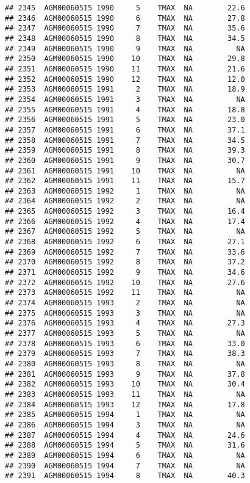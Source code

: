 \documentclass{article}\usepackage[]{graphicx}\usepackage[]{color}
\makeatletter
\newenvironment{kframe}{%
 \def\at@end@of@kframe{}%
 \ifinner\ifhmode%
  \def\at@end@of@kframe{\end{minipage}}%
  \begin{minipage}{\columnwidth}%
 \fi\fi%
 \def\FrameCommand##1{\hskip\@totalleftmargin \hskip-\fboxsep
 \colorbox{shadecolor}{##1}\hskip-\fboxsep
     \hskip-\linewidth \hskip-\@totalleftmargin \hskip\columnwidth}%
 \MakeFramed {\advance\hsize-\width
   \@totalleftmargin\z@ \linewidth\hsize
   \@setminipage}}%
 {\par\unskip\endMakeFramed%
 \at@end@of@kframe}
\newenvironment{knitrout}{}{} %
\makeatother
\begin{document}
\begin{knitrout}
\begin{kframe}
\begin{verbatim}
## 2345  AGM00060515 1990     5    TMAX  NA        22.6
## 2346  AGM00060515 1990     6    TMAX  NA        27.8
## 2347  AGM00060515 1990     7    TMAX  NA        35.6
## 2348  AGM00060515 1990     8    TMAX  NA        34.5
## 2349  AGM00060515 1990     9    TMAX  NA          NA
## 2350  AGM00060515 1990    10    TMAX  NA        29.8
## 2351  AGM00060515 1990    11    TMAX  NA        21.6
## 2352  AGM00060515 1990    12    TMAX  NA        12.0
## 2353  AGM00060515 1991     2    TMAX  NA        18.9
## 2354  AGM00060515 1991     3    TMAX  NA          NA
## 2355  AGM00060515 1991     4    TMAX  NA        18.8
## 2356  AGM00060515 1991     5    TMAX  NA        23.0
## 2357  AGM00060515 1991     6    TMAX  NA        37.1
## 2358  AGM00060515 1991     7    TMAX  NA        34.5
## 2359  AGM00060515 1991     8    TMAX  NA        39.3
## 2360  AGM00060515 1991     9    TMAX  NA        30.7
## 2361  AGM00060515 1991    10    TMAX  NA          NA
## 2362  AGM00060515 1991    11    TMAX  NA        15.7
## 2363  AGM00060515 1992     1    TMAX  NA          NA
## 2364  AGM00060515 1992     2    TMAX  NA          NA
## 2365  AGM00060515 1992     3    TMAX  NA        16.4
## 2366  AGM00060515 1992     4    TMAX  NA        17.4
## 2367  AGM00060515 1992     5    TMAX  NA          NA
## 2368  AGM00060515 1992     6    TMAX  NA        27.1
## 2369  AGM00060515 1992     7    TMAX  NA        33.6
## 2370  AGM00060515 1992     8    TMAX  NA        37.2
## 2371  AGM00060515 1992     9    TMAX  NA        34.6
## 2372  AGM00060515 1992    10    TMAX  NA        27.6
## 2373  AGM00060515 1992    11    TMAX  NA          NA
## 2374  AGM00060515 1993     2    TMAX  NA          NA
## 2375  AGM00060515 1993     3    TMAX  NA          NA
## 2376  AGM00060515 1993     4    TMAX  NA        27.3
## 2377  AGM00060515 1993     5    TMAX  NA          NA
## 2378  AGM00060515 1993     6    TMAX  NA        33.0
## 2379  AGM00060515 1993     7    TMAX  NA        38.3
## 2380  AGM00060515 1993     8    TMAX  NA          NA
## 2381  AGM00060515 1993     9    TMAX  NA        37.8
## 2382  AGM00060515 1993    10    TMAX  NA        30.4
## 2383  AGM00060515 1993    11    TMAX  NA          NA
## 2384  AGM00060515 1993    12    TMAX  NA        17.8
## 2385  AGM00060515 1994     1    TMAX  NA          NA
## 2386  AGM00060515 1994     3    TMAX  NA          NA
## 2387  AGM00060515 1994     4    TMAX  NA        24.6
## 2388  AGM00060515 1994     5    TMAX  NA        31.6
## 2389  AGM00060515 1994     6    TMAX  NA          NA
## 2390  AGM00060515 1994     7    TMAX  NA          NA
## 2391  AGM00060515 1994     8    TMAX  NA        40.3

\end{verbatim}
\end{kframe}
\end{knitrout}
\end{document}
